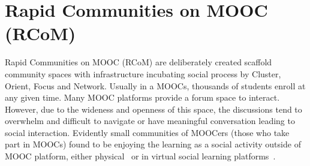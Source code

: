 \documentclass[format=acmsmall, review=false, screen=true]{acmart}
\begin{document}
%






\section{Rapid Communities on MOOC (RCoM)}
Rapid Communities on MOOC (RCoM) are deliberately created scaffold community spaces with infrastructure incubating social process by Cluster, Orient, Focus and Network. Usually in a MOOCs, thousands of students enroll at any given time. Many MOOC platforms provide a forum space to interact. However, due to the wideness and openness of this space, the discussions tend to overwhelm and difficult to navigate or have meaningful conversation leading to social interaction. Evidently small communities of MOOCers (those who take part in MOOCs) found to be enjoying the learning as a social activity outside of MOOC platform, either physical~\cite{damasceno2017massive} or in virtual social learning platforms~\cite{liu2016examining}. 
\end{document}
